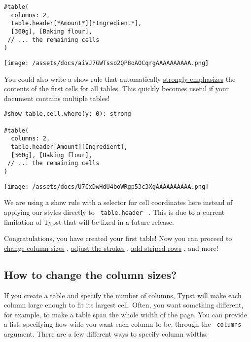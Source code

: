 \begin{verbatim}
#table(
  columns: 2,
  table.header[*Amount*][*Ingredient*],
  [360g], [Baking flour],
 // ... the remaining cells
)
\end{verbatim}

\texttt{[image: /assets/docs/aiVJ7GWTsso2QP8oAOCqrgAAAAAAAAAA.png]}

You could also write a show rule that automatically
\href{/docs/reference/model/strong/}{strongly emphasizes} the contents
of the first cells for all tables. This quickly becomes useful if your
document contains multiple tables!

\begin{verbatim}
#show table.cell.where(y: 0): strong

#table(
  columns: 2,
  table.header[Amount][Ingredient],
  [360g], [Baking flour],
 // ... the remaining cells
)
\end{verbatim}

\texttt{[image: /assets/docs/U7CxDwHdU4boWRgp53c3XgAAAAAAAAAA.png]}

We are using a show rule with a selector for cell coordinates here
instead of applying our styles directly to \texttt{\ table.header\ } .
This is due to a current limitation of Typst that will be fixed in a
future release.

Congratulations, you have created your first table! Now you can proceed
to \hyperref[column-sizes]{change column sizes} ,
\hyperref[strokes]{adjust the strokes} , \hyperref[fills]{add striped
rows} , and more!

\subsection{How to change the column sizes?}\label{column-sizes}

If you create a table and specify the number of columns, Typst will make
each column large enough to fit its largest cell. Often, you want
something different, for example, to make a table span the whole width
of the page. You can provide a list, specifying how wide you want each
column to be, through the \texttt{\ columns\ } argument. There are a few
different ways to specify column widths:

